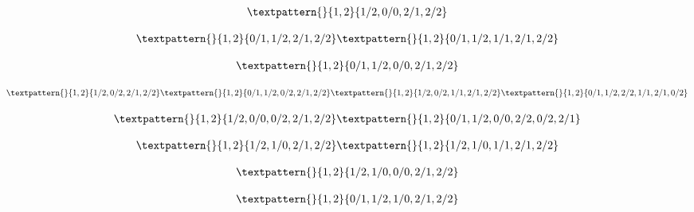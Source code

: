 \begin{equation}
	\begin{gathered}
		\textpattern{}{1,2}{1/2,0/0,2/1,2/2}
	\end{gathered}
	\label{cls:166}
\end{equation}

\begin{equation}
	\begin{gathered}
		\textpattern{}{1,2}{0/1,1/2,2/1,2/2}
		\textpattern{}{1,2}{0/1,1/2,1/1,2/1,2/2}
	\end{gathered}
	\label{cls:167}
\end{equation}

\begin{equation}
	\begin{gathered}
		\textpattern{}{1,2}{0/1,1/2,0/0,2/1,2/2}
	\end{gathered}
	\label{cls:168}
\end{equation}

\begin{equation}
	\begin{gathered}
		\textpattern{}{1,2}{1/2,0/2,2/1,2/2}
		\textpattern{}{1,2}{0/1,1/2,0/2,2/1,2/2}
		\textpattern{}{1,2}{1/2,0/2,1/1,2/1,2/2}
		\textpattern{}{1,2}{0/1,1/2,2/2,1/1,2/1,0/2}
	\end{gathered}
	\label{cls:169}
\end{equation}

\begin{equation}
	\begin{gathered}
		\textpattern{}{1,2}{1/2,0/0,0/2,2/1,2/2}
		\textpattern{}{1,2}{0/1,1/2,0/0,2/2,0/2,2/1}
	\end{gathered}
	\label{cls:170}
\end{equation}

\begin{equation}
	\begin{gathered}
		\textpattern{}{1,2}{1/2,1/0,2/1,2/2}
		\textpattern{}{1,2}{1/2,1/0,1/1,2/1,2/2}
	\end{gathered}
	\label{cls:171}
\end{equation}

\begin{equation}
	\begin{gathered}
		\textpattern{}{1,2}{1/2,1/0,0/0,2/1,2/2}
	\end{gathered}
	\label{cls:172}
\end{equation}

\begin{equation}
	\begin{gathered}
		\textpattern{}{1,2}{0/1,1/2,1/0,2/1,2/2}
	\end{gathered}
	\label{cls:173}
\end{equation}

